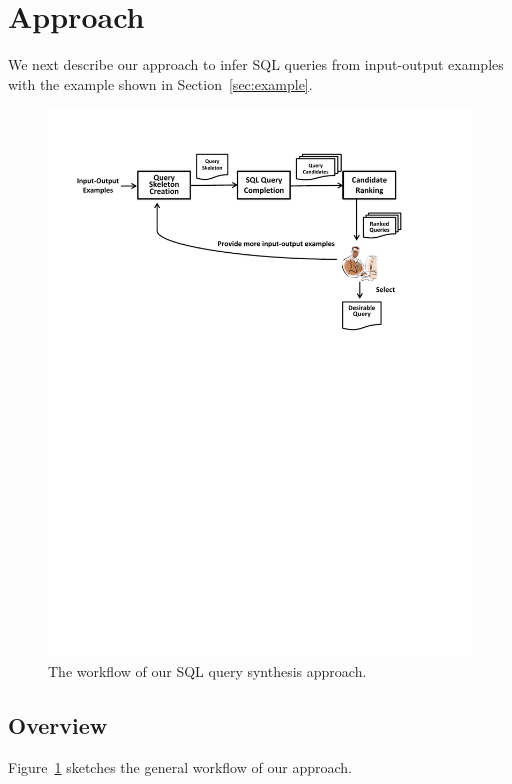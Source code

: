 
\section{Approach}
\label{sec:approach}



We next describe our approach to infer SQL queries from 
input-output examples with the example shown 
in Section~\ref{sec:example}. 

\begin{figure}[t]
  \centering
  \includegraphics[scale=0.53]{workflow}
  \vspace*{-5.0ex}\caption {{\label{fig:workflow} The workflow of our SQL query synthesis approach.
}}

\end{figure}

\subsection{Overview}
Figure~\ref{fig:workflow} sketches the general workflow of our approach.

